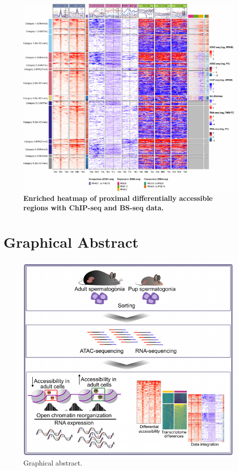 \documentclass[12pt,twoside]{reedthesis}
\begin{document}
\begin{figure}[htbp]

{\centering \includegraphics{thesis_files/figure-latex/dn7-1} 

}

\caption[Enriched heatmap of proximal DARs with ChIP-seq and BS-seq data]{\textbf{Enriched heatmap of proximal differentially accessible regions with ChIP-seq and BS-seq data.}}\label{fig:dn7}
\end{figure}
\hypertarget{graphical-abstract}{%
\section{Graphical Abstract}\label{graphical-abstract}}
\begin{figure}[htbp]

{\centering \includegraphics{thesis_files/figure-latex/dga-1} 

}

\caption[Graphical abstract]{Graphical abstract.}\label{fig:dga}
\end{figure}
\newpage
\end{document}
